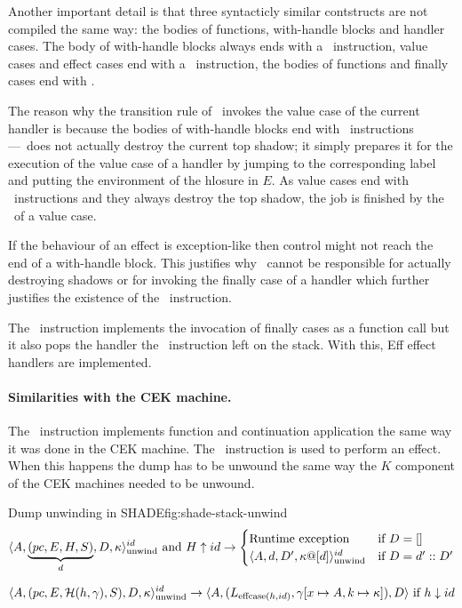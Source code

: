 \documentclass[class=article, crop=false]{standalone}
\begin{document}
Another important detail is that three syntacticly similar contstructs are not
compiled the same way: the bodies of functions, with-handle blocks and handler
cases.
The body of with-handle blocks
always ends with a \vmKillShadow\  instruction, value cases and effect cases end
with a \vmRett\ instruction, the bodies of functions and finally cases end with
\vmRet.

The reason why the transition rule of \vmKillShadow\ invokes the value case of
the current handler is because the bodies of with-handle blocks end with
\vmKillShadow\ instructions---\vmKillShadow\ does not actually destroy the
current top shadow; it simply prepares it for the execution of the value case
of a handler by jumping to the corresponding label and putting the environment
of the hlosure in $E$. As value cases end with \vmRett\ instructions and they
always destroy the top shadow, the job is finished by the \vmRett\ of a value
case.

If the behaviour of an effect is exception-like then control might not reach
the end of a with-handle block. This justifies why \vmKillShadow\ cannot be
responsible for actually destroying shadows or for invoking the finally case of
a handler which further justifies the existence of the \vmFin\ instruction.

The \vmFin\ instruction implements the invocation of finally cases as a
function call but it also pops the handler the \vmCastShadow\ instruction left
on the stack. With this, Eff effect handlers are implemented.

\paragraph{Similarities with the CEK machine.}
The \vmApply\ instruction implements function and continuation application the
same way it was done in the CEK machine. The \vmThrow\ instruction is used to
perform an effect. When this happens the dump has to be unwound the same way
the $K$ component of the CEK machines needed to be unwound.

\begin{myfigure}[1]{Dump unwinding in SHADE}{fig:shade-stack-unwind}
    $$ \langle A, \underbrace{(pc, E, H, S)}_d, D, \kappa  \rangle_\text{unwind}^{id} \text{ and } H \uparrow id \to \begin{cases}
        \text{Runtime exception} & \text{if } D = [] \\
    \langle A, d, D', \kappa @ [d] \rangle_\text{unwind}^{id} & \text{if } D = d' :: D' \end{cases} $$

    $$ \langle A, (pc, E, \mathcal{H}(h, \gamma), S), D, \kappa \rangle_\text{unwind}^{id} \to
        \langle A, (L_{\text{effcase}(h, id)}, \gamma[x \mapsto A, k \mapsto \kappa] ), D \rangle \text{ if } h \downarrow id $$
\end{myfigure}
\end{document}
